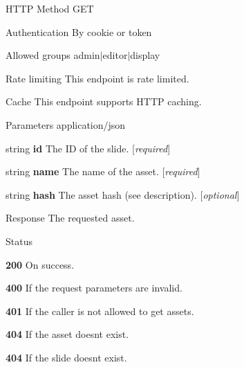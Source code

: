 \begin{DoxyParagraph}{H\+T\+TP Method}
G\+ET 
\end{DoxyParagraph}
\begin{DoxyParagraph}{Authentication}
By cookie or token 
\end{DoxyParagraph}
\begin{DoxyParagraph}{Allowed groups}
{\ttfamily admin$\vert$editor$\vert$display} 
\end{DoxyParagraph}
\begin{DoxyParagraph}{Rate limiting}
This endpoint is rate limited. 
\end{DoxyParagraph}
\begin{DoxyParagraph}{Cache}
This endpoint supports H\+T\+TP caching.
\end{DoxyParagraph}
\begin{DoxyParagraph}{Parameters}
application/json
\begin{DoxyItemize}
\item {\ttfamily string} {\bfseries id} The ID of the slide. \mbox{[}{\itshape required}\mbox{]}
\item {\ttfamily string} {\bfseries name} The name of the asset. \mbox{[}{\itshape required}\mbox{]}
\item {\ttfamily string} {\bfseries hash} The asset hash (see description). \mbox{[}{\itshape optional}\mbox{]}
\end{DoxyItemize}
\end{DoxyParagraph}
\begin{DoxyParagraph}{Response}
The requested asset.
\end{DoxyParagraph}
\begin{DoxyParagraph}{Status}

\begin{DoxyItemize}
\item {\bfseries 200} On success.
\item {\bfseries 400} If the request parameters are invalid.
\item {\bfseries 401} If the caller is not allowed to get assets.
\item {\bfseries 404} If the asset doesn\textquotesingle{}t exist.
\item {\bfseries 404} If the slide doesn\textquotesingle{}t exist. 
\end{DoxyItemize}
\end{DoxyParagraph}
